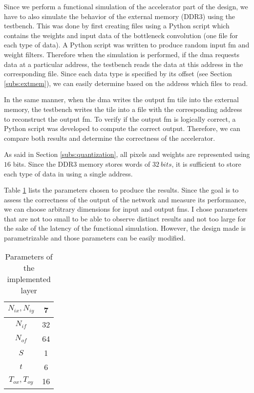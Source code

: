 Since we perform a functional simulation of the accelerator part of the design, we have to also simulate the behavior of the external memory (DDR3) using the testbench. This was done by first creating files using a Python script which contains the weights and input data of the bottleneck convolution (one file for each type of data). A Python script was written to produce random input \acrshort{fm} and weight filters. Therefore when the simulation is performed, if the \acrshort{dma} requests data at a particular address, the testbench reads the data at this address in the corresponding file. Since each data type is specified by its offset (see Section \ref{subs:extmem}), we can easily determine based on the address which files to read.

In the same manner, when the \acrshort{dma} writes the output \acrshort{fm} tile into the external memory, the testbench writes the tile into a file with the corresponding address to reconstruct the output \acrshort{fm}. To verify if the output \acrshort{fm} is logically correct, a Python script was developed to compute the correct output. Therefore, we can compare both results and determine the correctness of the accelerator.

As said in Section \ref{subs:quantization}, all pixels and weights are represented using $16$ bits. Since the DDR3 memory stores words of $32 \ bits$, it is sufficient to store each type of data in using a single address.

Table \ref{tab:param} lists the parameters chosen to produce the results. Since the goal is to assess the correctness of the output of the network and measure its performance, we can choose arbitrary dimensions for input and output \acrshort{fm}s. I chose parameters that are not too small to be able to observe distinct results and not too large for the sake of the latency of the functional simulation. However, the design made is parametrizable and those parameters can be easily modified.
%
\begin{table}[H]
    \centering
    \begin{tabular}{|c|c|}
    \hline
    $N_{ix}, N_{iy}$ & 7 \\
    \hline
    $N_{if} $ & 32 \\
    \hline
    $N_{of}$ & 64 \\
    \hline
    $S$ & 1\\
    \hline
    $t$ & 6 \\
    \hline
    $T_{ox}, T_{oy}$ & 16 \\
    \hline
    \end{tabular}
    \caption{Parameters of the implemented layer}
    \label{tab:param}
\end{table}
%
